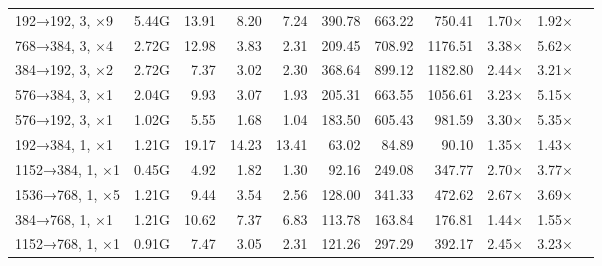 \begin{table}
\begin{tabular}{lrrrrrrrrrr}
    192→192, 3, ×9                                          & 5.44G  & 13.91                          & 8.20                             & 7.24                       & 390.78 & 663.22  & 750.41  & 1.70$\times$ & 1.92$\times$ \\
    768→384, 3, ×4                                          & 2.72G  & 12.98                          & 3.83                             & 2.31                       & 209.45 & 708.92  & 1176.51 & 3.38$\times$ & 5.62$\times$ \\
    384→192, 3, ×2                                          & 2.72G  & 7.37                           & 3.02                             & 2.30                       & 368.64 & 899.12  & 1182.80 & 2.44$\times$ & 3.21$\times$ \\
    576→384, 3, ×1                                          & 2.04G  & 9.93                           & 3.07                             & 1.93                       & 205.31 & 663.55  & 1056.61 & 3.23$\times$ & 5.15$\times$ \\
    576→192, 3, ×1                                          & 1.02G  & 5.55                           & 1.68                             & 1.04                       & 183.50 & 605.43  & 981.59  & 3.30$\times$ & 5.35$\times$ \\
    192→384, 1, ×1                                          & 1.21G  & 19.17                          & 14.23                            & 13.41                      & 63.02  & 84.89   & 90.10   & 1.35$\times$ & 1.43$\times$ \\
    1152→384, 1, ×1                                         & 0.45G  & 4.92                           & 1.82                             & 1.30                       & 92.16  & 249.08  & 347.77  & 2.70$\times$ & 3.77$\times$ \\
    1536→768, 1, ×5                                         & 1.21G  & 9.44                           & 3.54                             & 2.56                       & 128.00 & 341.33  & 472.62  & 2.67$\times$ & 3.69$\times$ \\
    384→768, 1, ×1                                          & 1.21G  & 10.62                          & 7.37                             & 6.83                       & 113.78 & 163.84  & 176.81  & 1.44$\times$ & 1.55$\times$ \\
    1152→768, 1, ×1                                         & 0.91G  & 7.47                           & 3.05                             & 2.31                       & 121.26 & 297.29  & 392.17  & 2.45$\times$ & 3.23$\times$ \\

\end{tabular}
\end{table}
